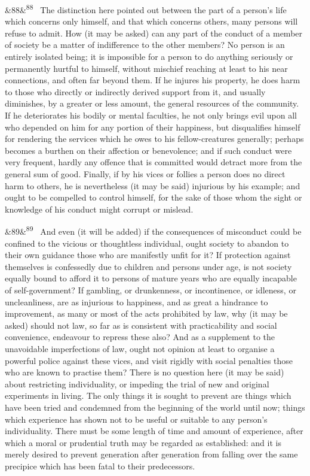 \documentclass[12pt]{article}
\newcommand{\para}[1][]{\par\noindent\ifx&#1&\else\textsuperscript{\footnotesize #1}~\fi}
\begin{document}
\para[88] The distinction here pointed out between the part of a person's life which concerns only himself, and that which concerns others, many persons will refuse to admit. How (it may be asked) can any part of the conduct of a member of society be a matter of indifference to the other members? No person is an entirely isolated being; it is impossible for a person to do anything seriously or permanently hurtful to himself, without mischief reaching at least to his near connections, and often far beyond them. If he injures his property, he does harm to those who directly or indirectly derived support from it, and usually diminishes, by a greater or less amount, the general resources of the community. If he deteriorates his bodily or mental faculties, he not only brings evil upon all who depended on him for any portion of their happiness, but disqualifies himself for rendering the services which he owes to his fellow-creatures generally; perhaps becomes a burthen on their affection or benevolence; and if such conduct were very frequent, hardly any offence that is committed would detract more from the general sum of good. Finally, if by his vices or follies a person does no direct harm to others, he is nevertheless (it may be said) injurious by his example; and ought to be compelled to control himself, for the sake of those whom the sight or knowledge of his conduct might corrupt or mislead.

\para[89] And even (it will be added) if the consequences of misconduct could be confined to the vicious or thoughtless individual, ought society to abandon to their own guidance those who are manifestly unfit for it? If protection against themselves is confessedly due to children and persons under age, is not society equally bound to afford it to persons of mature years who are equally incapable of self-government? If gambling, or drunkenness, or incontinence, or idleness, or uncleanliness, are as injurious to happiness, and as great a hindrance to improvement, as many or most of the acts prohibited by law, why (it may be asked) should not law, so far as is consistent with practicability and social convenience, endeavour to repress these also? And as a supplement to the unavoidable imperfections of law, ought not opinion at least to organise a powerful police against these vices, and visit rigidly with social penalties those who are known to practise them? There is no question here (it may be said) about restricting individuality, or impeding the trial of new and original experiments in living. The only things it is sought to prevent are things which have been tried and condemned from the beginning of the world until now; things which experience has shown not to be useful or suitable to any person's individuality. There must be some length of time and amount of experience, after which a moral or prudential truth may be regarded as established: and it is merely desired to prevent generation after generation from falling over the same precipice which has been fatal to their predecessors.
\end{document}
